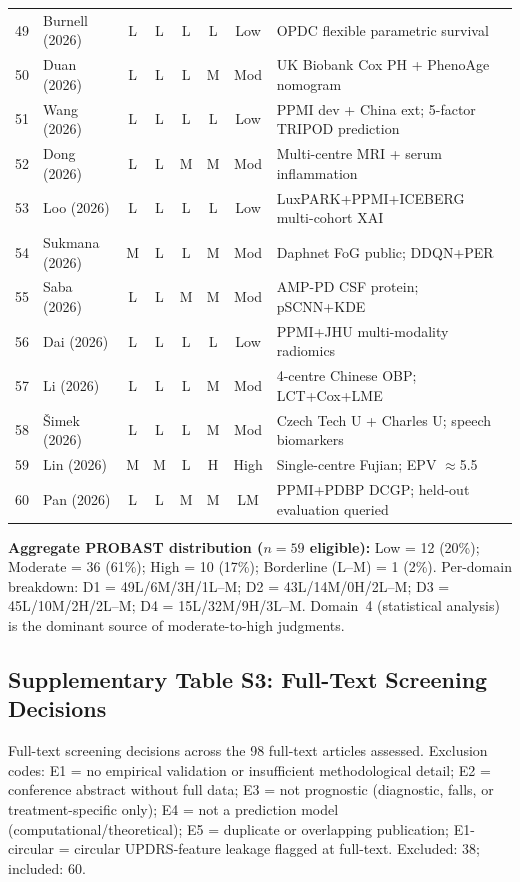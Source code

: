 \begin{longtable}{@{}cl ccccc p{5cm}@{}}
49 & Burnell (2026)     & L & L & L & L & Low  & OPDC flexible parametric survival \\
50 & Duan (2026)        & L & L & L & M & Mod  & UK Biobank Cox PH + PhenoAge nomogram \\
51 & Wang (2026)        & L & L & L & L & Low  & PPMI dev + China ext; 5-factor TRIPOD prediction \\
52 & Dong (2026)        & L & L & M & M & Mod  & Multi-centre MRI + serum inflammation \\
53 & Loo (2026)         & L & L & L & L & Low  & LuxPARK+PPMI+ICEBERG multi-cohort XAI \\
54 & Sukmana (2026)     & M & L & L & M & Mod  & Daphnet FoG public; DDQN+PER \\
55 & Saba (2026)        & L & L & M & M & Mod  & AMP-PD CSF protein; pSCNN+KDE \\
56 & Dai (2026)         & L & L & L & L & Low  & PPMI+JHU multi-modality radiomics \\
57 & Li (2026)          & L & L & L & M & Mod  & 4-centre Chinese OBP; LCT+Cox+LME \\
58 & \v{S}imek (2026)   & L & L & L & M & Mod  & Czech Tech U + Charles U; speech biomarkers \\
59 & Lin (2026)         & M & M & L & H & High & Single-centre Fujian; EPV $\approx$5.5 \\
60 & Pan (2026)         & L & L & M & M & LM   & PPMI+PDBP DCGP; held-out evaluation queried \\
\end{longtable}
\normalsize

\noindent\textbf{Aggregate PROBAST distribution ($n=59$ eligible):} Low = 12 (20\%); Moderate = 36 (61\%); High = 10 (17\%); Borderline (L--M) = 1 (2\%). Per-domain breakdown: D1 = 49L/6M/3H/1L--M; D2 = 43L/14M/0H/2L--M; D3 = 45L/10M/2H/2L--M; D4 = 15L/32M/9H/3L--M. Domain~4 (statistical analysis) is the dominant source of moderate-to-high judgments.

\subsection*{Supplementary Table S3: Full-Text Screening Decisions}
\label{sr:tab:supp:screening}

\noindent Full-text screening decisions across the 98 full-text articles assessed. Exclusion codes: E1 = no empirical validation or insufficient methodological detail; E2 = conference abstract without full data; E3 = not prognostic (diagnostic, falls, or treatment-specific only); E4 = not a prediction model (computational/theoretical); E5 = duplicate or overlapping publication; E1-circular = circular UPDRS-feature leakage flagged at full-text. Excluded: 38; included: 60.

